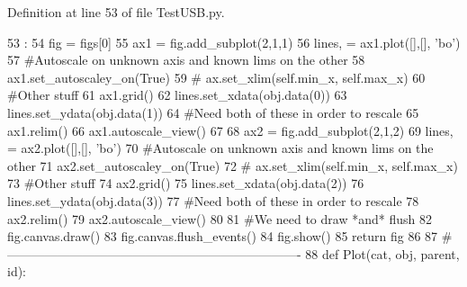 Definition at line 53 of file TestUSB.py.


\begin{DoxyCode}
53                           :
54     fig = figs[0]
55     ax1 = fig.add_subplot(2,1,1)
56     lines, = ax1.plot([],[], 'bo')
57     #Autoscale on unknown axis and known lims on the other
58     ax1.set_autoscaley_on(True)
59 #    ax.set_xlim(self.min_x, self.max_x)
60     #Other stuff
61     ax1.grid()        
62     lines.set_xdata(obj.data(0))
63     lines.set_ydata(obj.data(1))
64     #Need both of these in order to rescale
65     ax1.relim()
66     ax1.autoscale_view()
67 
68     ax2 = fig.add_subplot(2,1,2)
69     lines, = ax2.plot([],[], 'bo')
70     #Autoscale on unknown axis and known lims on the other
71     ax2.set_autoscaley_on(True)
72 #    ax.set_xlim(self.min_x, self.max_x)
73     #Other stuff
74     ax2.grid()        
75     lines.set_xdata(obj.data(2))
76     lines.set_ydata(obj.data(3))
77     #Need both of these in order to rescale
78     ax2.relim()
79     ax2.autoscale_view()
80 
81     #We need to draw *and* flush
82     fig.canvas.draw()
83     fig.canvas.flush_events()
84     fig.show()
85     return fig
86     
87 #----------------------------------------------------------------------
88 
def Plot(cat, obj, parent, id):
\end{DoxyCode}
